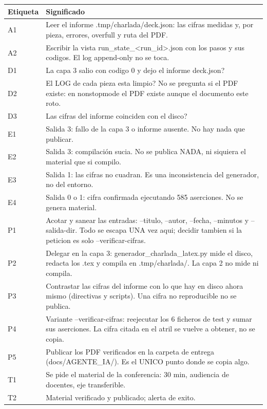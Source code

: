 \documentclass[11pt,a4paper]{article}
\begin{document}
\vspace{6pt}
\begin{tcolorbox}[cajaContenido, title={\faIcon{table}~Leyenda de etiquetas}]
\small
\begin{tabularx}{\linewidth}{@{}>{\centering\arraybackslash}p{1.4cm}X@{}}
\toprule
\textbf{Etiqueta} & \textbf{Significado} \\ \midrule
A1 & Leer el informe .tmp/charlada/deck.json: las cifras medidas y, por pieza, errores, overfull y ruta del PDF. \\
A2 & Escribir la vista run\_state\_<run\_id>.json con los pasos y sus codigos. El log append-only no se toca. \\
D1 & La capa 3 salio con codigo 0 y dejo el informe deck.json? \\
D2 & El LOG de cada pieza esta limpio? No se pregunta si el PDF existe: en nonstopmode el PDF existe aunque el documento este roto. \\
D3 & Las cifras del informe coinciden con el disco? \\
E1 & Salida 3: fallo de la capa 3 o informe ausente. No hay nada que publicar. \\
E2 & Salida 3: compilación sucia. No se publica NADA, ni siquiera el material que si compilo. \\
E3 & Salida 1: las cifras no cuadran. Es una inconsistencia del generador, no del entorno. \\
E4 & Salida 0 o 1: cifra confirmada ejecutando 585 aserciones. No se genera material. \\
P1 & Acotar y sanear las entradas: --titulo, --autor, --fecha, --minutos y --salida-dir. Todo se escapa UNA vez aqui; decidir tambien si la peticion es solo --verificar-cifras. \\
P2 & Delegar en la capa 3: generador\_charlada\_latex.py mide el disco, redacta los .tex y compila en .tmp/charlada/. La capa 2 no mide ni compila. \\
P3 & Contrastar las cifras del informe con lo que hay en disco ahora mismo (directivas y scripts). Una cifra no reproducible no se publica. \\
P4 & Variante --verificar-cifras: reejecutar los 6 ficheros de test y sumar sus aserciones. La cifra citada en el atril se vuelve a obtener, no se copia. \\
P5 & Publicar los PDF verificados en la carpeta de entrega (docs/AGENTE\_IA/). Es el UNICO punto donde se copia algo. \\
T1 & Se pide el material de la conferencia: 30 min, audiencia de docentes, eje transferible. \\
T2 & Material verificado y publicado; alerta de exito. \\
\bottomrule
\end{tabularx}
\end{tcolorbox}
\end{document}
